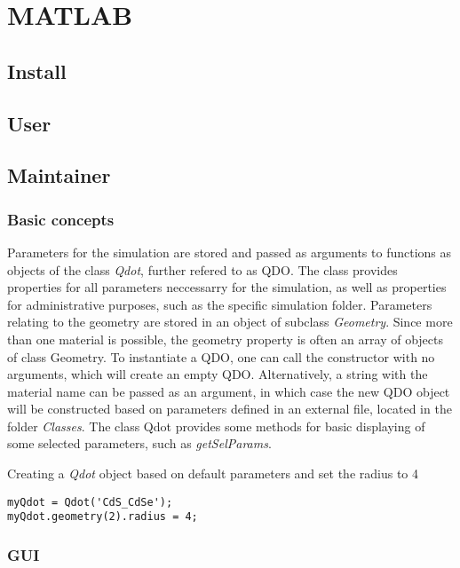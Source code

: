 \chapter{MATLAB}

\section{Install}
\section{User}
\section{Maintainer}

\subsection{Basic concepts}
Parameters for the simulation are stored and passed as arguments to functions as objects of the class \textit{Qdot}, further refered to as QDO. The class provides properties for all parameters neccessarry for the simulation, as well as properties for administrative purposes, such as the specific simulation folder. Parameters relating to the geometry are stored in an object of subclass \textit{Geometry}. Since more than one material is possible, the geometry property is often an array of objects of class Geometry. 
To instantiate a QDO, one can call the constructor with no arguments, which will create an empty QDO. Alternatively, a string with the material name can be passed as an argument, in which case the new QDO object will be constructed based on parameters defined in an external file, located in the folder \textit{Classes}.
The class Qdot provides some methods for basic displaying of some selected parameters, such as \textit{getSelParams}.\\

\begin{EXAMPLE}
Creating a \textit{Qdot} object based on default parameters and set the radius to 4
\begin{verbatim}
myQdot = Qdot('CdS_CdSe');
myQdot.geometry(2).radius = 4;
\end{verbatim}
\end{EXAMPLE}




\subsection{GUI}

